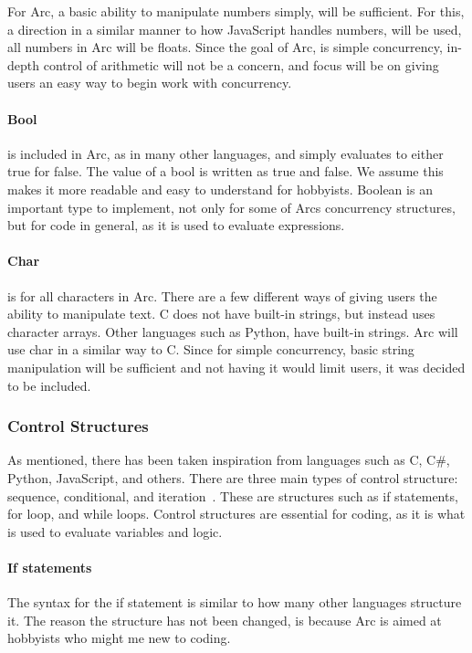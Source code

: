 For Arc, a basic ability to manipulate numbers simply, will be sufficient. For this, a direction in a similar manner to how JavaScript handles numbers, will be used, all numbers in Arc will be floats. Since the goal of Arc, is simple concurrency, in-depth control of arithmetic will not be a concern, and focus will be on giving users an easy way to begin work with concurrency.

\paragraph{Bool} is included in Arc, as in many other languages, and simply evaluates to either true for false. The value of a bool is written as true and false. We assume this makes it more readable and easy to understand for hobbyists. Boolean is an important type to implement, not only for some of Arcs concurrency structures, but for code in general, as it is used to evaluate expressions.

\paragraph{Char} is for all characters in Arc. There are a few different ways of giving users the ability to manipulate text. C does not have built-in strings, but instead uses character arrays. Other languages such as Python, have built-in strings. Arc will use char in a similar way to C. Since for simple concurrency, basic string manipulation will be sufficient and not having it would limit users, it was decided to be included.


\subsubsection{Control Structures} As mentioned, there has been taken inspiration from languages such as C, C\#, Python, JavaScript, and others. There are three main types of control structure: sequence, conditional, and iteration~\cite{CBook}. These are structures such as if statements, for loop, and while loops. Control structures are essential for coding, as it is what is used to evaluate variables and logic.

\paragraph{If statements} The syntax for the if statement is similar to how many other languages structure it. The reason the structure has not been changed, is because Arc is aimed at hobbyists who might me new to coding.


